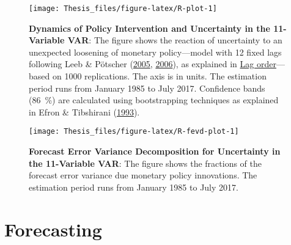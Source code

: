 \documentclass[12pt,twoside]{reedthesis}
\begin{document}
\begin{figure}

{\centering \texttt{[image: Thesis\_files/figure-latex/R-plot-1]} 

}

\caption[Dynamics of Policy Intervention and Uncertainty in the 11-Variable VAR]{\textbf{Dynamics of Policy Intervention and Uncertainty in the 11-Variable VAR}: The figure shows the reaction of uncertainty to an unexpected loosening of monetary policy---model with 12 fixed lags following Leeb \& Pötscher (\protect\hyperlink{ref-leebpots:2005}{2005}, \protect\hyperlink{ref-leebpots:2006}{2006}), as explained in \protect\hyperlink{lag-order}{Lag order}---based on 1000 replications. The axis is in units. The estimation period runs from January 1985 to July 2017. Confidence bands (86~\%) are calculated using bootstrapping techniques as explained in Efron \& Tibshirani (\protect\hyperlink{ref-efrotibs:1993}{1993}).}\label{fig:R-plot}
\end{figure}

\begin{figure}

{\centering \texttt{[image: Thesis\_files/figure-latex/R-fevd-plot-1]} 

}

\caption[Forecast Error Variance Decomposition for Uncertainty in the 11-Variable VAR]{\textbf{Forecast Error Variance Decomposition for Uncertainty in the 11-Variable VAR}: The figure shows the fractions of the forecast error variance due monetary policy innovations. The estimation period runs from January 1985 to July 2017.}\label{fig:R-fevd-plot}
\end{figure}
\hypertarget{forecasting}{%
\section{Forecasting}\label{forecasting}}
\end{document}
